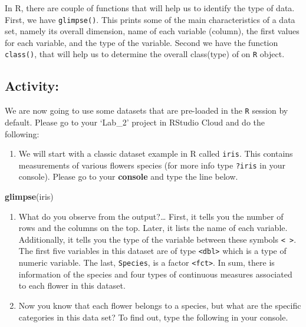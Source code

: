 \documentclass[
]{book}
\newenvironment{Shaded}{\begin{snugshade}}{\end{snugshade}}
\newcommand{\FunctionTok}[1]{\textcolor[rgb]{0.13,0.29,0.53}{\textbf{#1}}}
\newcommand{\NormalTok}[1]{#1}
\providecommand{\tightlist}{%
  \setlength{\itemsep}{0pt}\setlength{\parskip}{0pt}}
\begin{document}
In R, there are couple of functions that will help us to identify the type of data. First, we have \texttt{glimpse()}. This prints some of the main characteristics of a data set, namely its overall dimension, name of each variable (column), the first values for each variable, and the type of the variable. Second we have the function \texttt{class()}, that will help us to determine the overall class(type) of on \texttt{R} object.

\hypertarget{activity-2}{%
\subsection{Activity:}\label{activity-2}}

We are now going to use some datasets that are pre-loaded in the \texttt{R} session by default. Please go to your `Lab\_2' project in RStudio Cloud and do the following:

\begin{enumerate}
\def\labelenumi{\arabic{enumi}.}
\tightlist
\item
  We will start with a classic dataset example in R called \texttt{iris}. This contains measurements of various flowers species (for more info type \texttt{?iris} in your console). Please go to your \textbf{console} and type the line below.
\end{enumerate}

\begin{Shaded}
\begin{Highlighting}[]
\FunctionTok{glimpse}\NormalTok{(iris)}
\end{Highlighting}
\end{Shaded}

\begin{enumerate}
\def\labelenumi{\arabic{enumi}.}
\setcounter{enumi}{1}
\tightlist
\item
  What do you observe from the output?\ldots{} First, it tells you the number of rows and the columns on the top. Later, it lists the name of each variable. Additionally, it tells you the type of the variable between these symbols \texttt{\textless{}\ \textgreater{}}. The first five variables in this dataset are of type \texttt{\textless{}dbl\textgreater{}} which is a type of numeric variable. The last, \texttt{Species}, is a factor \texttt{\textless{}fct\textgreater{}}. In sum, there is information of the species and four types of continuous measures associated to each flower in this dataset.
\item
  Now you know that each flower belongs to a species, but what are the specific categories in this data set? To find out, type the following in your console.
\end{enumerate}
\end{document}
